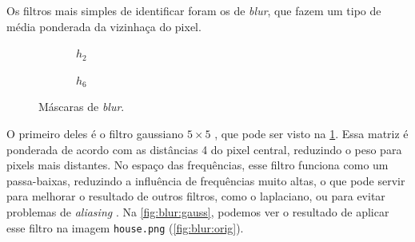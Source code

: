 Os filtros mais simples de identificar foram os de \textit{blur}, que fazem um tipo de média ponderada da vizinhaça do pixel.

\begin{figure}[H]
    \centering
    \begin{subfigure}{0.4\textwidth}
        \centering
        
        \caption{~$h_2$}
        \label{fig:h2}
    \end{subfigure}%
    \begin{subfigure}{0.4\textwidth}
        \centering
        
        \caption{~$h_6$}
        \label{fig:h6}
    \end{subfigure}

    \caption{Máscaras de \textit{blur}.}
    \label{fig:blur:kernel}
\end{figure}

O primeiro deles é o filtro gaussiano $5 \times 5$ \autocite{ref:gaussian}, que pode ser visto na \cref{fig:h2}. Essa matriz é ponderada de acordo com as distâncias 4 do pixel central, reduzindo o peso para pixels mais distantes. No espaço das frequências, esse filtro funciona como um passa-baixas, reduzindo a influência de frequências muito altas, o que pode servir para melhorar o resultado de outros filtros, como o laplaciano, ou para evitar problemas de \textit{aliasing} \autocite{ref:gaussian-lowpass}. Na \cref{fig:blur:gauss}, podemos ver o resultado de aplicar esse filtro na imagem \texttt{house.png} (\ref{fig:blur:orig}).

